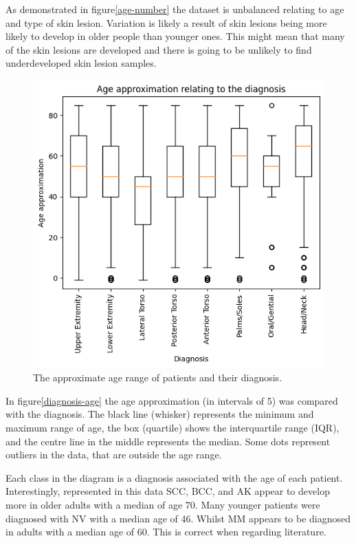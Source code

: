As demonstrated in figure\ref{age-number} the dataset is unbalanced relating to age and type of skin lesion. Variation is likely a result of skin lesions being more likely to develop in older people than younger ones. This might mean that many of the skin lesions are developed and there is going to be unlikely to find underdeveloped skin lesion samples.

\begin{figure}
	\centering
	\includegraphics[scale=0.75]{images/ISIC/diagnosis-age.png}
	\caption{The approximate age range of patients and their diagnosis.}
\end{figure} \label{diagnosis-age}

In figure\ref{diagnosis-age} the age approximation (in intervals of 5) was compared with the diagnosis. The black line (whisker) represents the minimum and maximum range of age, the box (quartile) shows the interquartile range (IQR), and the centre line in the middle represents the median. Some dots represent outliers in the data, that are outside the age range.

Each class in the diagram is a diagnosis associated with the age of each patient. Interestingly, represented in this data SCC, BCC, and AK appear to develop more in older adults with a median of age 70. Many younger patients were diagnosed with NV with a median age of 46. Whilst MM appears to be diagnosed in adults with a median age of 60. This is correct when regarding literature\cite{}.


